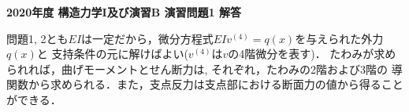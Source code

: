 \documentclass[10pt,a4j]{jarticle}
\newlength{\minitwocolumn}
\begin{document}
\newcommand{\fat}[1]{\mbox{\boldmath $#1$}}
\newcommand{\D}{\partial}
\newcommand{\w}{\omega}
\newcommand{\ga}{\alpha}
\newcommand{\gb}{\beta}
\newcommand{\gx}{\xi}
\newcommand{\gz}{\zeta}
\newcommand{\vhat}[1]{\hat{\fat{#1}}}
\newcommand{\spc}{\vspace{0.7\baselineskip}}
\newcommand{\halfspc}{\vspace{0.3\baselineskip}}

\pagestyle{empty}
\newcommand{\twofig}[2]
 {
   \begin{figure}[h]
     \begin{minipage}[t]{\minitwocolumn}
         \begin{center}   #1
         \end{center}
     \end{minipage}
         \hspace{\columnsep}
     \begin{minipage}[t]{\minitwocolumn}
         \begin{center} #2
         \end{center}
     \end{minipage}
   \end{figure}
 }
\begin{center}
{\Large \bf 2020年度 構造力学I及び演習B 演習問題1 解答} \\
\end{center}
問題1, 2とも$EI$は一定だから，微分方程式$EIv^{(4)}=q(x)$を与えられた外力$q(x)$と
支持条件の元に解けばよい($v^{(4)}$は$v$の4階微分を表す)．
たわみが求められれば，曲げモーメントとせん断力は, それぞれ，たわみの2階および3階の
導関数から求められる．また，支点反力は支点部における断面力の値から得ることができる．
\end{document}
